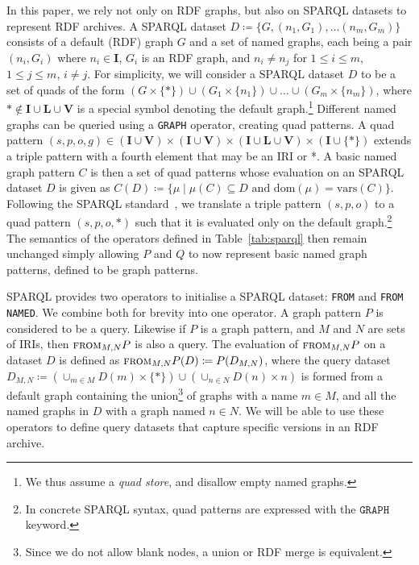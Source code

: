 \documentclass{llncs}
\newcommand{\I}{\ensuremath{\mathbf{I}}\xspace}
\renewcommand{\L}{\ensuremath{\mathbf{L}}\xspace}
\newcommand{\V}{\ensuremath{\mathbf{V}}\xspace}
\newcommand{\sfrom}[3]{\ensuremath{\textsc{from}_{#2,#3}#1}}
\newcommand{\dom}[1]{\ensuremath{\mathrm{dom}(#1)}}
\newcommand{\vars}[1]{\ensuremath{\mathrm{vars}(#1)}}
\begin{document}
In this paper, we rely not only on RDF graphs, but also on SPARQL datasets to represent RDF archives. A SPARQL dataset $D \coloneqq \{ G, (n_1,G_1), \ldots (n_m,G_m) \}$ consists of a default (RDF) graph $G$ and a set of named graphs, each being a pair $(n_i,G_i)$ where $n_i \in \I$, $G_i$ is an RDF graph, and $n_i \neq n_j$ for $1 \leq i \leq m$, $1 \leq j \leq m$, $i \neq j$. For simplicity, we will consider a SPARQL dataset $D$ to be a set of quads of the form $(G \times \{*\}) \cup (G_1 \times \{n_1\}) \cup \ldots \cup (G_m \times \{n_m\})$, where $* \notin \I \cup \L \cup \V$ is a special symbol denoting the default graph.\footnote{We thus assume a \textit{quad store}, and disallow empty named graphs.} Different named graphs can be queried using a \texttt{GRAPH} operator, creating quad patterns. A quad pattern $(s,p,o,g) \in (\I \cup \V) \times (\I \cup \V) \times (\I \cup \L \cup \V) \times (\I \cup \{ *\})$ extends a triple pattern with a fourth element that may be an IRI or *. A basic named graph pattern $C$ is then a set of quad patterns whose evaluation on an SPARQL dataset $D$ is given as $C(D) \coloneqq \{ \mu \mid \mu(C) \subseteq D\text{ and }\dom{\mu} = \vars{C} \}$. Following the SPARQL standard~\cite{sparql11}, we translate a triple pattern $(s,p,o)$ to a quad pattern $(s,p,o,*)$ such that it is evaluated only on the default graph.\footnote{In concrete SPARQL syntax, quad patterns are expressed with the $\texttt{GRAPH}$ keyword.} The semantics of the operators defined in Table~\ref{tab:sparql} then remain unchanged simply allowing $P$ and $Q$ to now represent basic named graph patterns, defined to be graph patterns.

SPARQL provides two operators to initialise a SPARQL dataset: \texttt{FROM} and \texttt{FROM NAMED}. We combine both for brevity into one operator. A graph pattern $P$ is considered to be a query. Likewise if $P$ is a graph pattern, and $M$ and $N$ are sets of IRIs, then $\sfrom{P}{M}{N}$ is also a query. The evaluation of $\sfrom{P}{M}{N}$ on a dataset $D$ is defined as $\sfrom{P}{M}{N}(D) \coloneqq P(D_{M,N})$, where the query dataset $D_{M,N} \coloneqq (\cup_{m \in M} D(m) \times \{ *\}) \cup  (\cup_{n \in N} D(n) \times n)$ is formed from a default graph containing the union\footnote{Since we do not allow blank nodes, a union or RDF merge is equivalent.} of graphs with a name $m \in M$, and all the named graphs in $D$ with a graph named $n \in N$. We will be able to use these operators to define query datasets that capture specific versions in an RDF archive.
\end{document}
